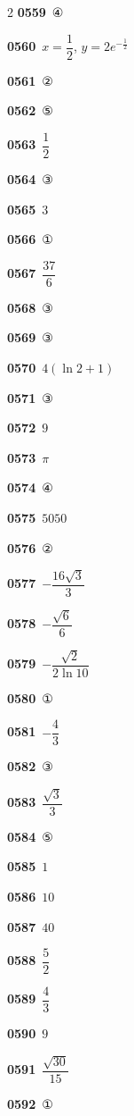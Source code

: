 \documentclass[10pt,a4paper]{article}
\begin{document}
\begin{multicols}{2}
\noindent\textbf{0559}\ ④\par
\noindent\textbf{0560}\ $x=\dfrac{1}{2}$, $y=2e^{-\frac{1}{2}}$\par
\noindent\textbf{0561}\ ②\par
\noindent\textbf{0562}\ ⑤\par
\noindent\textbf{0563}\ $\dfrac{1}{2}$\par
\noindent\textbf{0564}\ ③\par
\noindent\textbf{0565}\ $3$\par
\noindent\textbf{0566}\ ①\par
\noindent\textbf{0567}\ $\dfrac{37}{6}$\par
\noindent\textbf{0568}\ ③\par
\noindent\textbf{0569}\ ③\par
\noindent\textbf{0570}\ $4(\ln 2+1)$\par
\noindent\textbf{0571}\ ③\par
\noindent\textbf{0572}\ $9$\par
\noindent\textbf{0573}\ $\pi$\par
\noindent\textbf{0574}\ ④\par
\noindent\textbf{0575}\ $5050$\par
\noindent\textbf{0576}\ ②\par
\noindent\textbf{0577}\ $-\dfrac{16\sqrt{3}}{3}$\par
\noindent\textbf{0578}\ $-\dfrac{\sqrt{6}}{6}$\par
\noindent\textbf{0579}\ $-\dfrac{\sqrt{2}}{2\ln 10}$\par
\noindent\textbf{0580}\ ①\par
\noindent\textbf{0581}\ $-\dfrac{4}{3}$\par
\noindent\textbf{0582}\ ③\par
\noindent\textbf{0583}\ $\dfrac{\sqrt{3}}{3}$\par
\noindent\textbf{0584}\ ⑤\par
\noindent\textbf{0585}\ $1$\par
\noindent\textbf{0586}\ $10$\par
\noindent\textbf{0587}\ $40$\par
\noindent\textbf{0588}\ $\dfrac{5}{2}$\par
\noindent\textbf{0589}\ $\dfrac{4}{3}$\par
\noindent\textbf{0590}\ $9$\par
\noindent\textbf{0591}\ $\dfrac{\sqrt{30}}{15}$\par
\noindent\textbf{0592}\ ①\par

\end{multicols}
\end{document}
